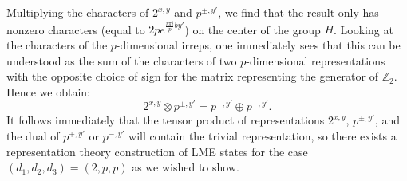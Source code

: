 \documentclass[12pt]{article}
\theoremstyle{definition}
\begin{document}
Multiplying the characters of $2^{x,y}$ and $p^{\pm,y'}$, we find that the result only has nonzero characters (equal to $2pe^{\frac{r \pi i}{p} b y'}$) on the center of the group $H$. Looking at the characters of the $p$-dimensional irreps, one immediately sees that this can be understood as the sum of the characters of two $p$-dimensional representations with the opposite choice of sign for the matrix representing the generator of $\mathbb{Z}_2$. Hence we obtain:
\begin{equation}
2^{x,y} \otimes p^{\pm,y'} = p^{+,y'} \oplus p^{-,y'}.
\label{singletensorpdt}
\end{equation}
It follows immediately that the tensor product of representations $2^{x,y}$, $p^{\pm,y'}$, and the dual of $p^{+,y'}$ or $p^{-,y'}$ will contain the trivial representation, so there exists a representation theory construction of LME states for the case $(d_1,d_2,d_3) = (2,p,p)$ as we wished to show.
\end{document}
